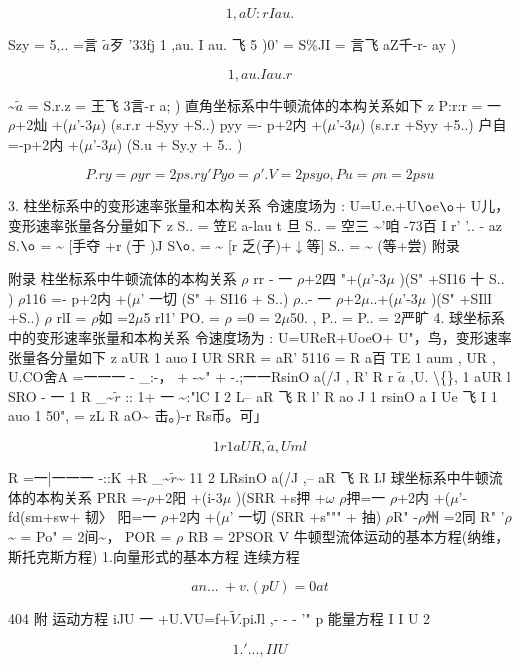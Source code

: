 \[1 ,aU:r I au. \]

Szy = 5,.. =言 $\tilde{a}$歹 '33fj 1 ,au. I au. 飞 5 )0' = S\%JI = 言飞 aZ千-r- ay )

\[1 ,au. I au.r  \]

\textasciitilde{}$\tilde{a}$ = S.r.z = 王飞 3言-r a; ) 直角坐标系中牛顿流体的本构关系如下 z P:r:r = 一 $\rho$+2灿 +($\mu$'-3$\mu$) (s.r.r +Syy +S..) pyy =- p+2内 +($\mu$'-3$\mu$) (s.r.r +Syy +5..) 户自 =-p+2内 +($\mu$'-3$\mu$) (S.u + Sy.y + 5.. )

\[P.ry = \rho yr = 2ps.ry' Pyo = \rho '.V = 2psyo , Pu = \rho n = 2psu\]

3. 柱坐标系中的变形速率张量和本构关系 令速度场为 : U=U.e.+U${\rm ø}$e${\rm ø}$+ U儿，变形速率张量各分量如下 z S.. = 笠E a-lau t 旦 S.. = 空三 \textasciitilde{}'咱 -73百 I r' '.. - az S.${\rm ø}$ = \textasciitilde{} [手夺 +r (于 )J S${\rm ø}$. = \textasciitilde{} [r 乏(子)+$\downarrow$等] S.. = \textasciitilde{} (等+尝) 附录

附录 柱坐标系中牛顿流体的本构关系 $\rho$ rr - 一 $\rho$+2四 "+($\mu$'-3$\mu$ )(S" +SI16 十 S.. ) $\rho$116 =- p+2内 +($\mu$' 一切 (S" + SI16 + S..) $\rho$..- 一 $\rho$+2$\mu$..+($\mu$'-3$\mu$ )(S" +SIlI +S..) $\rho$ rlI = $\rho$如 =2$\mu$5 rl1' PO. = $\rho$ =0 = 2$\mu$50. , P.. = P.. = 2严旷 4. 球坐标系中的变形速率张量和本构关系 令速度场为 : U=UReR+UoeO+ U"，鸟，变形速率张量各分量如下 z aUR 1 auo I UR SRR = aR' 5116 = R a百 TE 1 aum , UR , U.CO舍A =一一一 - \_:-， + -\textasciitilde{}" + -.;一一RsinO a(/J , R' R r $\tilde{a}$ ,U. \textbackslash\{\}, 1 aUR l SRO - 一 1 R \_\textasciitilde{}$\tilde{r}$ :: 1+ 一 \textasciitilde{}:"lC I 2 L-- aR 飞 R l' R ao J 1 rsinO a I Ue 飞 I 1 auo 1 50", = zL R aO\textasciitilde{} 击。)-r Rs币。可」

\[1 r 1 aU R , \tilde{a} ,U m   l\]

R =一|一一一 -::K +R \_\textasciitilde{}$\tilde{r}$\textasciitilde{} 11 2 LRsinO a(/J ,-- aR 飞 R IJ 球坐标系中牛顿流体的本构关系 PRR =-$\rho$+2阳 +(i-3$\mu$ )(SRR +s押 +$\omega$ $\rho$押=一 $\rho$+2内 +($\mu$'-fd(sm+sw+ 韧〉 阳=一 $\rho$+2内 +($\mu$' 一切 (SRR +s""" + 抽) $\rho$R" -$\rho$州 =2同 R" '$\rho$\textasciitilde{} = Po" = 2间\textasciitilde{}， POR = $\rho$ RB = 2PSOR V 牛顿型流体运动的基本方程(纳维，斯托克斯方程) 1.向量形式的基本方程 连续方程

\[an ... ~ + v . (pU) = 0 at\]

404 附 运动方程 iJU 一 +U.VU=f+$\tilde{V}$.piJl ,- - - '" p 能量方程 I I U 2

\[  1.' ..., I I U\]

